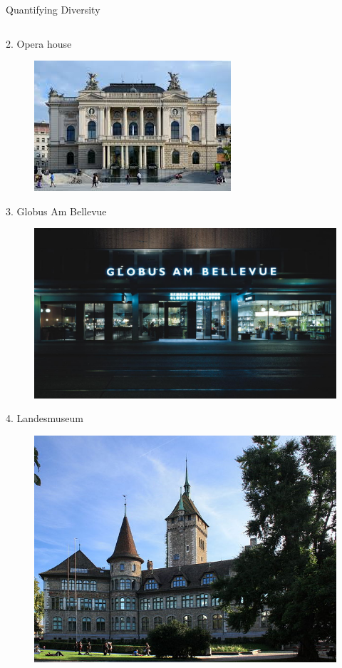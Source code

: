 \documentclass{beamer}
\begin{document}
\begin{frame}{Quantifying Diversity}
\begin{columns}
\begin{column}{0.48\textwidth}
\begin{figure}
      \end{figure}
      2. Opera house
      \begin{figure}
        \centering
        \includegraphics[height=.07\textheight]{zurich_opera}
      \end{figure}
      3. Globus Am Bellevue
      \begin{figure}
        \centering
        \includegraphics[height=.07\textheight]{globus_bellevue}
      \end{figure}
      4. Landesmuseum
      \begin{figure}
        \centering
        \includegraphics[height=.07\textheight]{landesmuseum}
      \end{figure}
    \end{column}
  \end{columns}
  
\end{frame}
\end{document}
